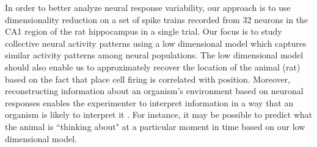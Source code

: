 In order to better analyze neural response variability, our approach is to use dimensionality reduction on a set of spike trains recorded from 32 neurons in the CA1 region of the rat hippocampus in a single trial.
Our focus is to study collective neural activity patterns using a low dimensional model which captures similar activity patterns among neural populations. The low dimensional model should also enable us to approximately recover the location of the animal (rat) based on the fact that place cell firing is correlated with position.
Moreover, reconstructing information about an organism's environment based on neuronal responses enables the experimenter to interpret information in a way that an organism is likely to interpret it \cite{Bialek1992}. For instance, it may be possible to predict what the animal is ``thinking about" at a particular moment in time based on our low dimensional model.







































%











